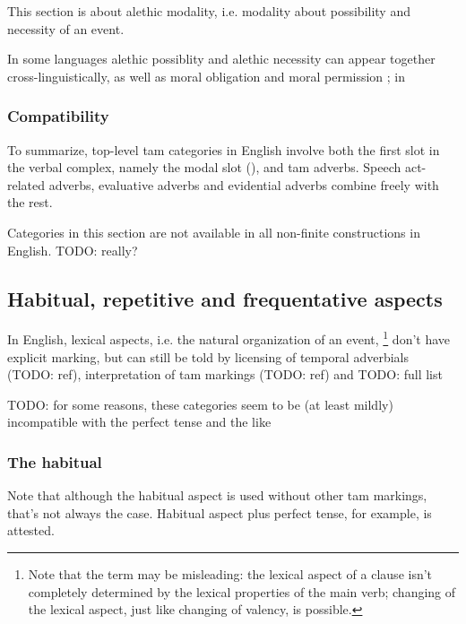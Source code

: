 \documentclass[UTF8, a4paper, oneside, scheme=plain, 12pt]{ctexbook}
\newcommand*{\citepage}[1]{p.~{#1}}
\begin{document}
This section is about alethic modality, i.e. modality about possibility and necessity of an event.

In some languages alethic possiblity and alethic necessity can appear together cross-linguistically,
as well as moral obligation and moral permission
\citep[\citepage{80}]{cinque1999adverbs};
in 


\begin{exe}
    \ex 
\end{exe}


\subsubsection{Compatibility}

To summarize, top-level \ac{tam} categories in English 
involve both the first slot in the verbal complex,
namely the modal slot
(),
and \ac{tam} adverbs.
Speech act-related adverbs, evaluative adverbs 
and evidential adverbs combine freely with the rest.

Categories in this section are not available 
in all non-finite constructions in English. TODO: really?

\subsection{Habitual, repetitive and frequentative aspects}

In English, lexical aspects, i.e. the natural organization of an event,%
\footnote{
    Note that the term may be misleading:
    the lexical aspect of a clause 
    isn't completely determined by the lexical properties of the main verb;
    changing of the lexical aspect, just like changing of valency, is possible.
}
don't have explicit marking, 
but can still be told by licensing of temporal adverbials (TODO: ref),
interpretation of \acs{tam} markings (TODO: ref) and TODO: full list

TODO: for some reasons, these categories seem to be (at least mildly) incompatible with the perfect tense and the like

\subsubsection{The habitual}

Note that although the habitual aspect is used without other \ac{tam} markings, 
that's not always the case. 
Habitual aspect plus perfect tense, for example, 
is attested. 
\end{document}
